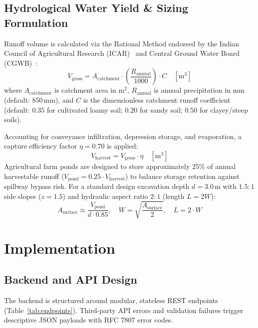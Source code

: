 \documentclass[manuscript,screen,review]{acmart}
\begin{document}
\subsection{Hydrological Water Yield \& Sizing Formulation}
Runoff volume is calculated via the Rational Method endorsed by the Indian Council of Agricultural Research (ICAR)~\cite{icar2011} and Central Ground Water Board (CGWB)~\cite{cgwb2019}:
\begin{equation}
    V_{\text{gross}} = A_{\text{catchment}} \cdot \left(\frac{R_{\text{annual}}}{1000}\right) \cdot C \quad [\text{m}^3]
\end{equation}
where $A_{\text{catchment}}$ is catchment area in $\text{m}^2$, $R_{\text{annual}}$ is annual precipitation in mm (default: 850\,mm), and $C$ is the dimensionless catchment runoff coefficient (default: $0.35$ for cultivated loamy soil; $0.20$ for sandy soil; $0.50$ for clayey/steep soils).

Accounting for conveyance infiltration, depression storage, and evaporation, a capture efficiency factor $\eta = 0.70$ is applied:
\begin{equation}
    V_{\text{harvest}} = V_{\text{gross}} \cdot \eta \quad [\text{m}^3]
\end{equation}
Agricultural farm ponds are designed to store approximately 25\% of annual harvestable runoff ($V_{\text{pond}} = 0.25 \cdot V_{\text{harvest}}$) to balance storage retention against spillway bypass risk. For a standard design excavation depth $d = 3.0$\,m with $1.5:1$ side slopes ($z = 1.5$) and hydraulic aspect ratio $2:1$ (length $L = 2W$):
\begin{equation}
    A_{\text{surface}} \approx \frac{V_{\text{pond}}}{d \cdot 0.85}, \quad W = \sqrt{\frac{A_{\text{surface}}}{2}}, \quad L = 2 \cdot W
\end{equation}

\section{Implementation}
\label{sec:implementation}

\subsection{Backend and API Design}
The backend is structured around modular, stateless REST endpoints (Table~\ref{tab:endpoints}). Third-party API errors and validation failures trigger descriptive JSON payloads with RFC 7807 error codes.
\end{document}
